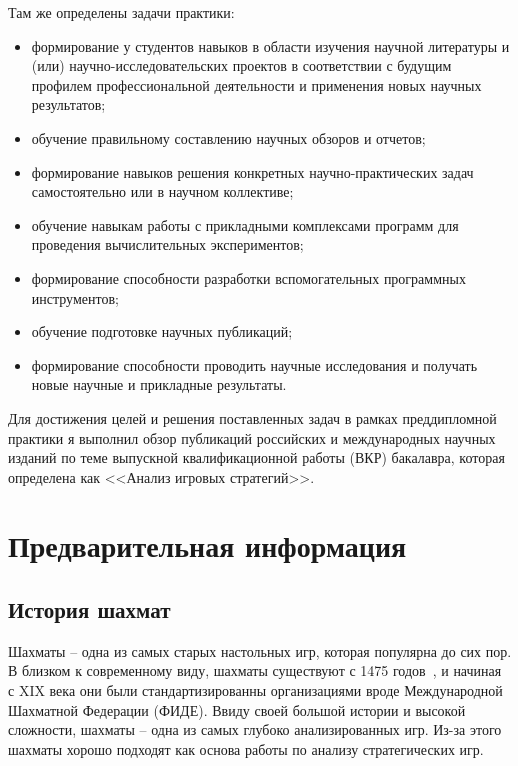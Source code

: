\documentclass{article}
\begin{document}
    Там же определены задачи практики:
\begin{itemize}
\item формирование у студентов навыков в области изучения научной литературы и (или) научно-исследовательских проектов в соответствии с будущим профилем профессиональной деятельности и применения новых научных результатов;
\item обучение правильному составлению научных обзоров и отчетов;
\item формирование навыков решения конкретных научно-практических задач самостоятельно или в научном коллективе;
\item обучение навыкам работы с прикладными комплексами программ для проведения вычислительных экспериментов;
\item формирование способности разработки вспомогательных программных инструментов;
\item обучение подготовке научных публикаций;
\item формирование способности проводить научные исследования и получать новые научные и прикладные результаты.
\end{itemize}

    Для достижения целей и решения поставленных задач в рамках преддипломной практики я выполнил обзор публикаций российских и международных научных изданий по теме выпускной квалификационной работы (ВКР) бакалавра, которая определена как <<Анализ игровых стратегий>>.

\newpage

\tableofcontents

\newpage

\section{Предварительная информация}

\subsection{История шахмат}

Шахматы -- одна из самых старых настольных игр, которая популярна до сих пор.
В близком к современному виду, шахматы существуют с 1475 годов~\cite{world_of_chess},
и начиная с XIX века они были стандартизированны организациями вроде Международной
Шахматной Федерации (ФИДЕ). Ввиду своей большой истории и высокой сложности, шахматы -- 
одна из самых глубоко анализированных игр. Из-за этого шахматы хорошо подходят 
как основа работы по анализу стратегических игр.
\end{document}
